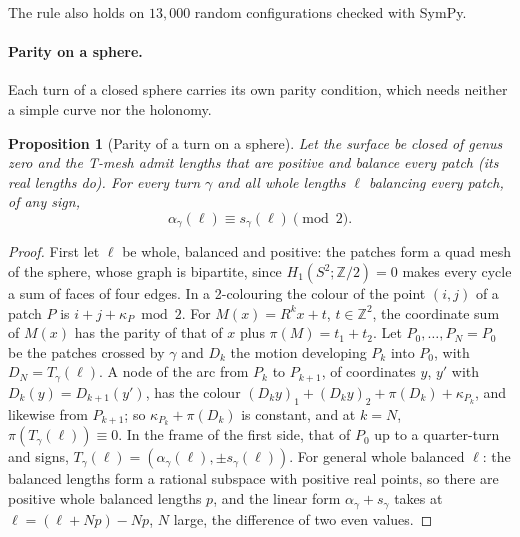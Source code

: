 \documentclass[11pt,a4paper]{article}
\newtheorem{proposition}{Proposition}
\newcommand{\Z}{\mathbb{Z}}
\newcommand{\shift}{s}
\newcommand{\lean}[1]{\texttt{\detokenize{#1}}}
\newenvironment{evidence}[3][]{}{}
\begin{document}
The rule also holds on $13{,}000$ random configurations checked with SymPy.

\paragraph{Parity on a sphere.}
Each turn of a closed sphere carries its own parity condition, which needs
neither a simple curve nor the holonomy.

\begin{evidence}{lean}{\lean{TMesh.parity_of_turn_sphere}, from \lean{TMesh.bipartite_of_sphere} (the quad graph of a connected T-mesh with $P - A + N = 2$ is bipartite, by \lean{QuadSurface.bipartite_of_euler} and \lean{TMesh.eulerQuad_eq_nodeCount}) and \lean{TMesh.parity_of_turn_of_colouring}; the sphere is $P - A + N = 2$ and connected, and the turn is followed by the walk at every positive balanced whole $\ell$; tested: \lean{TMesh.IsColouring} decided on the 35 spheres of 50 random instances, 4{,}388 turns}
\begin{proposition}[Parity of a turn on a sphere]\label{prop:parity}
Let the surface be closed of genus zero and the T-mesh admit lengths that are
positive and balance every patch (its real lengths do). For every turn
$\gamma$ and all whole lengths $\ell$ balancing every patch, of any sign,
\[
  \alpha_\gamma(\ell) \equiv \shift_\gamma(\ell) \pmod 2 .
\]
\end{proposition}
\end{evidence}

\begin{proof}
First let $\ell$ be whole, balanced and positive: the patches form a quad mesh
of the sphere, whose graph is bipartite, since $H_1(S^2; \Z/2) = 0$ makes
every cycle a sum of faces of four edges. In a 2-colouring the colour of the
point $(i, j)$ of a patch $P$ is $i + j + \kappa_P \bmod 2$. For $M(x) = R^k
x + t$, $t \in \Z^2$, the coordinate sum of $M(x)$ has the parity of that of
$x$ plus $\pi(M) = t_1 + t_2$. Let $P_0, \dots, P_N = P_0$ be the patches
crossed by $\gamma$ and $D_k$ the motion developing $P_k$ into $P_0$, with
$D_N = T_\gamma(\ell)$. A node of the arc from $P_k$ to $P_{k+1}$, of
coordinates $y$, $y'$ with $D_k(y) = D_{k+1}(y')$, has the colour $(D_k y)_1 +
(D_k y)_2 + \pi(D_k) + \kappa_{P_k}$, and likewise from $P_{k+1}$; so
$\kappa_{P_k} + \pi(D_k)$ is constant, and at $k = N$, $\pi(T_\gamma(\ell))
\equiv 0$. In the frame of the first side, that of $P_0$ up to a quarter-turn
and signs, $T_\gamma(\ell) = (\alpha_\gamma(\ell),
\pm\shift_\gamma(\ell))$. For general whole balanced $\ell$: the balanced
lengths form a rational subspace with positive real points, so there are
positive whole balanced lengths $p$, and the linear form $\alpha_\gamma +
\shift_\gamma$ takes at $\ell = (\ell + Np) - Np$, $N$ large, the difference
of two even values.
\end{proof}
\end{document}
